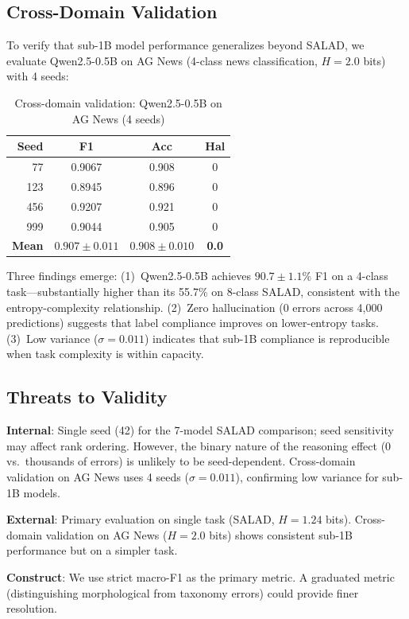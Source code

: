 \documentclass[review,3p]{elsarticle}
\begin{document}
\subsection{Cross-Domain Validation}
To verify that sub-1B model performance generalizes beyond SALAD, we evaluate Qwen2.5-0.5B on AG News (4-class news classification, $H = 2.0$ bits) with 4 seeds:

\begin{table}[!ht]
\centering
\caption{Cross-domain validation: Qwen2.5-0.5B on AG News (4 seeds)}
\label{tab:agnews}
\begin{tabular}{rccc}
\toprule
\textbf{Seed} & \textbf{F1} & \textbf{Acc} & \textbf{Hal} \\
\midrule
77 & 0.9067 & 0.908 & 0 \\
123 & 0.8945 & 0.896 & 0 \\
456 & 0.9207 & 0.921 & 0 \\
999 & 0.9044 & 0.905 & 0 \\
\midrule
\textbf{Mean} & $\mathbf{0.907 \pm 0.011}$ & $\mathbf{0.908 \pm 0.010}$ & \textbf{0.0} \\
\bottomrule
\end{tabular}
\end{table}

Three findings emerge: (1)~Qwen2.5-0.5B achieves $90.7 \pm 1.1$\% F1 on a 4-class task---substantially higher than its 55.7\% on 8-class SALAD, consistent with the entropy-complexity relationship. (2)~Zero hallucination (0 errors across 4,000 predictions) suggests that label compliance improves on lower-entropy tasks. (3)~Low variance ($\sigma = 0.011$) indicates that sub-1B compliance is reproducible when task complexity is within capacity.

\subsection{Threats to Validity}
\textbf{Internal}: Single seed (42) for the 7-model SALAD comparison; seed sensitivity may affect rank ordering. However, the binary nature of the reasoning effect (0 vs.\ thousands of errors) is unlikely to be seed-dependent. Cross-domain validation on AG News uses 4 seeds ($\sigma = 0.011$), confirming low variance for sub-1B models.

\textbf{External}: Primary evaluation on single task (SALAD, $H = 1.24$ bits). Cross-domain validation on AG News ($H = 2.0$ bits) shows consistent sub-1B performance but on a simpler task.

\textbf{Construct}: We use strict macro-F1 as the primary metric. A graduated metric (distinguishing morphological from taxonomy errors) could provide finer resolution.
\end{document}
